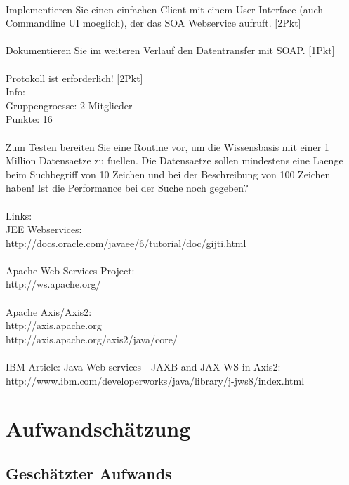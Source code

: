 \documentclass[11pt]{article}
\begin{document}
\\
Implementieren Sie einen einfachen Client mit einem User Interface (auch Commandline UI moeglich), der das SOA Webservice aufruft. [2Pkt]\\
\\
Dokumentieren Sie im weiteren Verlauf den Datentransfer mit SOAP. [1Pkt]\\
\\
Protokoll ist erforderlich! [2Pkt]\\
Info:\\
Gruppengroesse: 2 Mitglieder\\
Punkte: 16\\
\\
Zum Testen bereiten Sie eine Routine vor, um die Wissensbasis mit einer 1 Million Datensaetze zu fuellen. Die Datensaetze sollen mindestens eine Laenge beim Suchbegriff von 10 Zeichen und bei der Beschreibung von 100 Zeichen haben! Ist die Performance bei der Suche noch gegeben?\\
\\
Links:\\
JEE Webservices: \\
http://docs.oracle.com/javaee/6/tutorial/doc/gijti.html\\
\\
Apache Web Services Project:\\ 
http://ws.apache.org/\\
\\
Apache Axis/Axis2:\\
http://axis.apache.org\\
http://axis.apache.org/axis2/java/core/\\
\\
IBM Article: Java Web services - JAXB and JAX-WS in Axis2:\\
http://www.ibm.com/developerworks/java/library/j-jws8/index.html

\newpage
\section{Aufwandschätzung}

\subsection{Geschätzter Aufwands}
\end{document}
